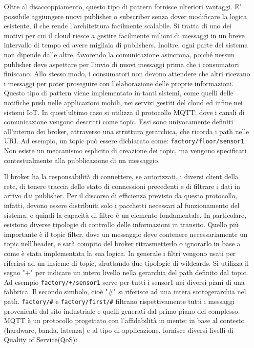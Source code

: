 \noindent Oltre al disaccoppiamento, questo tipo di pattern fornisce ulteriori vantaggi\cite{a9IoT4Arch}. E' possibile aggiungere nuovi publisher o subscriber senza dover modificare la logica esistente, il che rende l'architettura facilmente scalabile. Si tratta di uno dei motivi per cui il cloud riesce a gestire facilmente milioni di messaggi in un breve intervallo di tempo ed avere migliaia di publishers. Inoltre, ogni parte del sistema non dipende dalle altre, favorendo la comunicazione asincrona, poiché nessun publisher deve aspettare per l'invio di nuovi messaggi prima che i consumatori finiscano. Allo stesso modo, i consumatori non devono attendere che altri ricevano i messaggi per poter proseguire con l'elaborazione delle proprie informazioni. Questo tipo di pattern viene implementato in tanti sistemi, come quelli delle notifiche push nelle applicazioni mobili, nei servizi gestiti del cloud ed infine nei sistemi IoT. In quest'ultimo caso si utilizza il protocollo MQTT, dove i canali di comunicazione vengono descritti come topic. Essi sono univocamente definiti all'interno dei broker, attraverso una struttura gerarchica, che ricorda i path nelle URI. Ad esempio, un topic può essere dichiarato come: \texttt{factory/floor/sensor1}. Non esiste un meccanismo esplicito di creazione dei topic, ma vengono specificati contestualmente alla pubblicazione di un messaggio.

Il broker ha la responsabilità di connettere, se autorizzati, i diversi client della rete, di tenere traccia dello stato di connessioni precedenti e di filtrare i dati in arrivo dai publisher. Per il discorso di efficienza previsto da questo protocollo, infatti, devono essere distribuiti solo i pacchetti necessari al funzionamento del sistema, e quindi la capacità di filtro è un elemento fondamentale. In particolare, esistono diverse tipologie di controllo delle informazioni in transito. Quello più importante è il topic filter, dove un messaggio deve contenere necessariamente un topic nell'header, e sarà compito del broker ritrasmetterlo o ignorarlo in base a come è stata implementata la sua logica. In generale i filtri vengono usati per riferirsi ad un insieme di topic, sfruttando due tipologie di wildcards. Si utilizza il segno "+" per indicare un intero livello nella gerarchia del path definito dal topic. Ad esempio \texttt{factory/+/sensor1} serve per tutti i sensor1 nei diversi piani di una fabbrica. Il secondo simbolo, cioè "\#" si riferisce ad una intera sottogerarchia nel path. \texttt{factory/\#} e \texttt{factory/first/\#} filtrano rispettivamente tutti i messaggi provenienti dal sito industriale e quelli generati dal primo piano del complesso. MQTT è un protocollo progettato con l'affidabilità in mente: in base al contesto (hardware, banda, latenza) e al tipo di applicazione, fornisce diversi livelli di Quality of Service(QoS):


